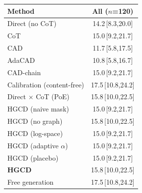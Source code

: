 \begin{tabular}{lc}
\toprule
Method & All ($n$=120) \\
\midrule
Direct (no CoT) & 14.2\,{\scriptsize[8.3,20.0]} \\
CoT & 15.0\,{\scriptsize[9.2,21.7]} \\
CAD & 11.7\,{\scriptsize[5.8,17.5]} \\
AdaCAD & 10.8\,{\scriptsize[5.8,16.7]} \\
CAD-chain & 15.0\,{\scriptsize[9.2,21.7]} \\
Calibration (content-free) & 17.5\,{\scriptsize[10.8,24.2]} \\
Direct $\times$ CoT (PoE) & 15.8\,{\scriptsize[10.0,22.5]} \\
HGCD (naive mask) & 15.0\,{\scriptsize[9.2,21.7]} \\
HGCD (no graph) & 15.8\,{\scriptsize[10.0,22.5]} \\
HGCD (log-space) & 15.0\,{\scriptsize[9.2,21.7]} \\
HGCD (adaptive $\alpha$) & 15.0\,{\scriptsize[9.2,21.7]} \\
HGCD (placebo) & 15.0\,{\scriptsize[9.2,21.7]} \\
\textbf{HGCD} & 15.8\,{\scriptsize[10.0,22.5]} \\
Free generation & 17.5\,{\scriptsize[10.8,24.2]} \\
\bottomrule
\end{tabular}
